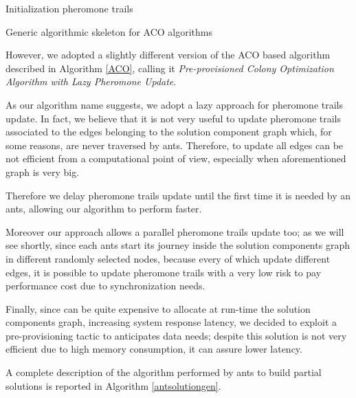 \documentclass[12pt,a4paper]{report}
\begin{document}
\begin{algorithm}\label{ACO}
	Initialization pheromone trails\;
	\caption{Generic algorithmic skeleton for ACO algorithms}
\end{algorithm}

However, we adopted a slightly different version of the ACO based algorithm described in Algorithm \ref{ACO}, calling it \textit{Pre-provisioned Colony Optimization Algorithm with Lazy Pheromone Update}.

As our algorithm name suggests, we adopt a lazy approach for pheromone trails update. In fact, we believe that it is not very useful to update pheromone trails associated to the edges belonging to the solution component graph which, for some reasons, are never traversed by ants. Therefore, to update all edges can be not efficient from a computational point of view, especially when aforementioned graph is very big.

Therefore we delay pheromone trails update until the first time it is needed by an ants, allowing our algorithm to perform faster. 

Moreover our approach allows a parallel pheromone trails update too; as we will see shortly, since each ants start its journey inside the solution components graph in different randomly selected nodes, because every of which update different edges, it is possible to update pheromone trails with a very low risk to pay performance cost due to synchronization needs.

Finally, since can be quite expensive to allocate at run-time the solution components graph, increasing system response latency, we decided to exploit a pre-provisioning tactic\cite{Tactics} to anticipates data needs; despite this solution is not very efficient due to high memory consumption, it can assure lower latency.

A complete description of the algorithm performed by ants to build partial solutions is reported in Algorithm \ref{antsolutiongen}.
\end{document}
